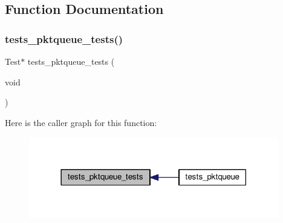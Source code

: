 \subsection{Function Documentation}
\mbox{\label{tests-pktqueue_8c_a3a1b15024f563f5acb4293527c3b6cf7}} 
\subsubsection{\texorpdfstring{tests\+\_\+pktqueue\+\_\+tests()}{tests\_pktqueue\_tests()}}
{\footnotesize\ttfamily Test$\ast$ tests\+\_\+pktqueue\+\_\+tests (\begin{DoxyParamCaption}\item[{void}]{ }\end{DoxyParamCaption})}

Here is the caller graph for this function\+:
\nopagebreak
\begin{figure}[H]
\begin{center}
\leavevmode
\includegraphics[width=309pt]{tests-pktqueue_8c_a3a1b15024f563f5acb4293527c3b6cf7_icgraph}
\end{center}
\end{figure}
